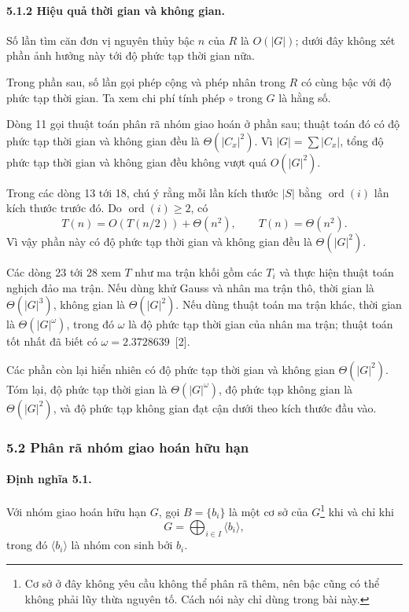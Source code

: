 \documentclass[11pt]{article}
\begin{document}
\paragraph{5.1.2 Hiệu quả thời gian và không gian.}
Số lần tìm căn đơn vị nguyên thủy bậc \(n\) của \(R\) là \(O(|G|)\); dưới đây
không xét phần ảnh hưởng này tới độ phức tạp thời gian nữa.

Trong phần sau, số lần gọi phép cộng và phép nhân trong \(R\) có cùng bậc với
độ phức tạp thời gian. Ta xem chi phí tính phép \(\circ\) trong \(G\) là hằng
số.

Dòng 11 gọi thuật toán phân rã nhóm giao hoán ở phần sau; thuật toán đó có độ
phức tạp thời gian và không gian đều là \(\Theta(|C_x|^2)\). Vì
\(|G|=\sum |C_x|\), tổng độ phức tạp thời gian và không gian đều không vượt quá
\(O(|G|^2)\).

Trong các dòng 13 tới 18, chú ý rằng mỗi lần kích thước \(|S|\) bằng
\(\operatorname{ord}(i)\) lần kích thước trước đó. Do
\(\operatorname{ord}(i)\ge2\), có
\[
  T(n)=O(T(n/2))+\Theta(n^2),\qquad T(n)=\Theta(n^2).
\]
Vì vậy phần này có độ phức tạp thời gian và không gian đều là \(\Theta(|G|^2)\).

Các dòng 23 tới 28 xem \(T\) như ma trận khối gồm các \(T_i\) và thực hiện thuật
toán nghịch đảo ma trận. Nếu dùng khử Gauss và nhân ma trận thô, thời gian là
\(\Theta(|G|^3)\), không gian là \(\Theta(|G|^2)\). Nếu dùng thuật toán ma trận
khác, thời gian là \(\Theta(|G|^\omega)\), trong đó \(\omega\) là độ phức tạp
thời gian của nhân ma trận; thuật toán tốt nhất đã biết có
\(\omega=2.3728639\)~[2].

Các phần còn lại hiển nhiên có độ phức tạp thời gian và không gian
\(\Theta(|G|^2)\). Tóm lại, độ phức tạp thời gian là \(\Theta(|G|^\omega)\), độ
phức tạp không gian là \(\Theta(|G|^2)\), và độ phức tạp không gian đạt cận dưới
theo kích thước đầu vào.

\subsubsection*{5.2 Phân rã nhóm giao hoán hữu hạn}

\paragraph{Định nghĩa 5.1.}
Với nhóm giao hoán hữu hạn \(G\), gọi \(B=\{b_i\}\) là một cơ sở của
\(G\)\footnote{Cơ sở ở đây không yêu cầu không thể phân rã thêm, nên bậc cũng
có thể không phải lũy thừa nguyên tố. Cách nói này chỉ dùng trong bài này.} khi
và chỉ khi
\[
  G=\bigoplus_{i\in I}\langle b_i\rangle,
\]
trong đó \(\langle b_i\rangle\) là nhóm con sinh bởi \(b_i\).
\end{document}
